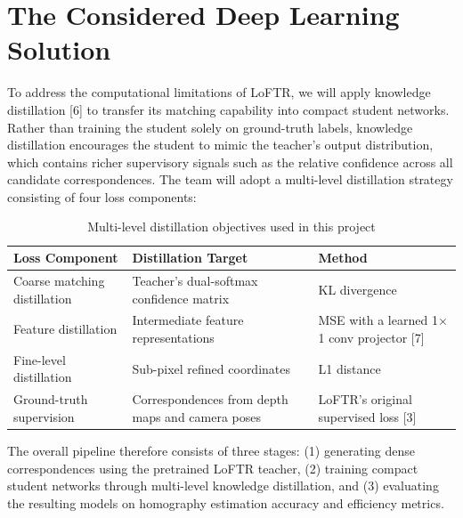 \documentclass{article}
\begin{document}
\section{The Considered Deep Learning Solution}
To address the computational limitations of LoFTR, we will apply knowledge distillation [6] to transfer its matching capability into compact student networks. Rather than training the student solely on ground-truth labels, knowledge distillation encourages the student to mimic the teacher's output distribution, which contains richer supervisory signals such as the relative confidence across all candidate correspondences. The team will adopt a multi-level distillation strategy consisting of four loss components:

\begin{table}[H]
\centering
\caption{Multi-level distillation objectives used in this project}
\label{tab:distillation-components}
\renewcommand{\arraystretch}{1.2}
\begin{tabular}{|p{}|p{}|p{}|}
\hline
\textbf{Loss Component} & \textbf{Distillation Target} & \textbf{Method} \\
\hline
Coarse matching distillation & Teacher's dual-softmax confidence matrix & KL divergence \\
\hline
Feature distillation & Intermediate feature representations & MSE with a learned 1$\times$1 conv projector [7] \\
\hline
Fine-level distillation & Sub-pixel refined coordinates & L1 distance \\
\hline
Ground-truth supervision & Correspondences from depth maps and camera poses & LoFTR's original supervised loss [3] \\
\hline
\end{tabular}
\end{table}

The overall pipeline therefore consists of three stages: (1) generating dense correspondences using the pretrained LoFTR teacher, (2) training compact student networks through multi-level knowledge distillation, and (3) evaluating the resulting models on homography estimation accuracy and efficiency metrics.
\end{document}
